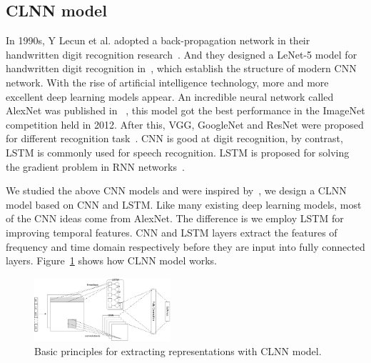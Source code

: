 \documentclass[conference]{IEEEtran}
\begin{document}
\subsection{CLNN model}
In 1990s, Y Lecun et al. adopted a back-propagation network in their handwritten digit recognition research~\cite{lecun1990handwritten}. And they designed a LeNet-5 model for handwritten digit recognition in~\cite{6}, which establish the structure of modern CNN network. With the rise of artificial intelligence technology, more and more excellent deep learning models appear. An incredible neural network called AlexNet was published in ~\cite{8}, this model got the best performance in the ImageNet competition held in 2012. After this, VGG, GoogleNet and ResNet were proposed for different recognition task~\cite{9,10,11}. CNN is good at digit recognition, by contrast, LSTM is commonly used for speech recognition. LSTM is proposed for solving the gradient problem in RNN networks~\cite{lstm}.


We studied the above CNN models and were inspired by~\cite{clnn},
we design a CLNN model based on CNN and LSTM. Like many existing deep learning models, most of the CNN ideas come from AlexNet. The difference is we employ LSTM for improving temporal features. CNN and LSTM layers extract the features of frequency and time domain respectively before they are input into fully connected layers. Figure~\ref{fig:cnnlstm} shows how CLNN model works.

\begin{figure}[htp]
\begin{center}
\includegraphics[width=0.45\textwidth]{cnnlstm.eps}
\caption{Basic principles for extracting representations with CLNN model.}\label{fig:cnnlstm}
\end{center}
\end{figure}
\end{document}
